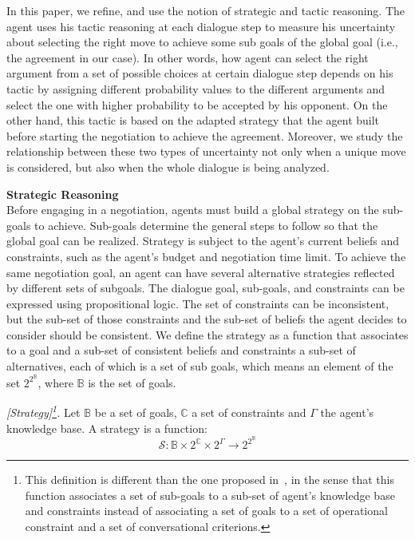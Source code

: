 In this paper, we refine, and use the notion of strategic and tactic reasoning. The agent uses his tactic reasoning at each dialogue
step to measure his uncertainty about selecting the right move to achieve some sub goals of the global goal (i.e., the agreement in our case).
In other words, how agent can select the right argument from a set of possible choices at certain dialogue step depends on his tactic by assigning
different probability values to the different arguments and select the one with higher probability to be accepted by his opponent. On the other hand,
this tactic is based on the adapted strategy that the agent built before starting the negotiation to achieve the agreement. Moreover, we study the
relationship between these two types of uncertainty not only when a unique move is considered, but also when the whole dialogue is being analyzed.


\textbf{Strategic Reasoning}\\
Before engaging in a negotiation, agents must build a global strategy on the sub-goals to achieve. Sub-goals determine the general steps to follow so
that the global goal can be realized. Strategy is subject to the agent's current beliefs and constraints, such as the agent's budget and negotiation
time limit. To achieve the same negotiation goal, an agent can have several alternative strategies reflected by different sets of subgoals. The dialogue
goal, sub-goals, and constraints can be expressed using propositional logic. The set of constraints can be inconsistent, but the sub-set of those constraints
and the sub-set of beliefs the agent decides to consider should be consistent. We define the strategy as a function that associates to a goal and a sub-set
of consistent beliefs and constraints a sub-set of alternatives, each of which is a set of sub goals, which means an element of the set $2^{2^{\mathbb{B}}}$,
where $\mathbb{B}$ is the set of goals.

\begin{definition}{\emph{[Strategy]\footnote{This definition is different than the one proposed in~\cite{Mbarki06}, in the sense that this function
associates a set of sub-goals to a sub-set of agent's knowledge base and constraints instead of associating a set of goals to a set of operational constraint
and a set of conversational criterions.}. }} \label{strategy}
Let $\mathbb{B}$ be a set of goals, $\mathbb{C}$ a set of constraints and $\Gamma$ the agent's knowledge base. A strategy is a function:
\begin{equation}\label{equation2-}
\mathcal{S}: \mathbb{B} \times 2^{\mathbb{C}} \times 2^{\Gamma}
\rightarrow 2^{2^{\mathbb{B}}}
\end{equation}
\end{definition}

